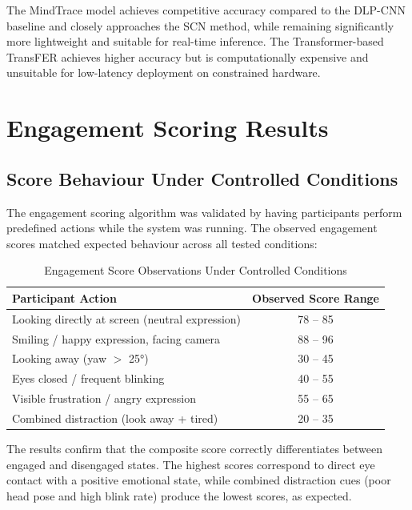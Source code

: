 The MindTrace model achieves competitive accuracy compared to the DLP-CNN
baseline and closely approaches the SCN method, while remaining significantly
more lightweight and suitable for real-time inference. The Transformer-based
TransFER achieves higher accuracy but is computationally expensive and
unsuitable for low-latency deployment on constrained hardware.

\section{Engagement Scoring Results}

\subsection{Score Behaviour Under Controlled Conditions}

The engagement scoring algorithm was validated by having participants perform
predefined actions while the system was running. The observed engagement scores
matched expected behaviour across all tested conditions:

\begin{table}[H]
\centering
\caption{Engagement Score Observations Under Controlled Conditions}
\begin{tabular}{lc}
\toprule
\textbf{Participant Action}                     & \textbf{Observed Score Range} \\
\midrule
Looking directly at screen (neutral expression) & 78 -- 85 \\
Smiling / happy expression, facing camera       & 88 -- 96 \\
Looking away (yaw $>$ 25°)                      & 30 -- 45 \\
Eyes closed / frequent blinking                 & 40 -- 55 \\
Visible frustration / angry expression          & 55 -- 65 \\
Combined distraction (look away + tired)        & 20 -- 35 \\
\bottomrule
\end{tabular}
\end{table}

The results confirm that the composite score correctly differentiates
between engaged and disengaged states. The highest scores correspond to
direct eye contact with a positive emotional state, while combined
distraction cues (poor head pose and high blink rate) produce the lowest
scores, as expected.

